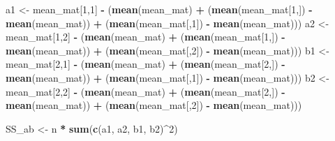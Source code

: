 \documentclass[
]{book}
\newenvironment{Shaded}{\begin{snugshade}}{\end{snugshade}}
\newcommand{\DecValTok}[1]{\textcolor[rgb]{0.00,0.00,0.81}{#1}}
\newcommand{\KeywordTok}[1]{\textcolor[rgb]{0.13,0.29,0.53}{\textbf{#1}}}
\newcommand{\NormalTok}[1]{#1}
\newcommand{\OperatorTok}[1]{\textcolor[rgb]{0.81,0.36,0.00}{\textbf{#1}}}
\newcommand{\StringTok}[1]{\textcolor[rgb]{0.31,0.60,0.02}{#1}}
\begin{document}
\begin{Shaded}
\begin{Highlighting}[]
\NormalTok{a1 <-}\StringTok{ }\NormalTok{mean_mat[}\DecValTok{1}\NormalTok{,}\DecValTok{1}\NormalTok{] }\OperatorTok{-}\StringTok{ }\NormalTok{(}\KeywordTok{mean}\NormalTok{(mean_mat) }\OperatorTok{+}\StringTok{ }
\StringTok{                         }\NormalTok{(}\KeywordTok{mean}\NormalTok{(mean_mat[}\DecValTok{1}\NormalTok{,]) }\OperatorTok{-}\StringTok{ }\KeywordTok{mean}\NormalTok{(mean_mat)) }\OperatorTok{+}\StringTok{ }
\StringTok{                         }\NormalTok{(}\KeywordTok{mean}\NormalTok{(mean_mat[,}\DecValTok{1}\NormalTok{]) }\OperatorTok{-}\StringTok{ }\KeywordTok{mean}\NormalTok{(mean_mat)))}
\NormalTok{a2 <-}\StringTok{ }\NormalTok{mean_mat[}\DecValTok{1}\NormalTok{,}\DecValTok{2}\NormalTok{] }\OperatorTok{-}\StringTok{ }\NormalTok{(}\KeywordTok{mean}\NormalTok{(mean_mat) }\OperatorTok{+}\StringTok{ }
\StringTok{                         }\NormalTok{(}\KeywordTok{mean}\NormalTok{(mean_mat[}\DecValTok{1}\NormalTok{,]) }\OperatorTok{-}\StringTok{ }\KeywordTok{mean}\NormalTok{(mean_mat)) }\OperatorTok{+}\StringTok{ }
\StringTok{                         }\NormalTok{(}\KeywordTok{mean}\NormalTok{(mean_mat[,}\DecValTok{2}\NormalTok{]) }\OperatorTok{-}\StringTok{ }\KeywordTok{mean}\NormalTok{(mean_mat)))}
\NormalTok{b1 <-}\StringTok{ }\NormalTok{mean_mat[}\DecValTok{2}\NormalTok{,}\DecValTok{1}\NormalTok{] }\OperatorTok{-}\StringTok{ }\NormalTok{(}\KeywordTok{mean}\NormalTok{(mean_mat) }\OperatorTok{+}\StringTok{ }
\StringTok{                         }\NormalTok{(}\KeywordTok{mean}\NormalTok{(mean_mat[}\DecValTok{2}\NormalTok{,]) }\OperatorTok{-}\StringTok{ }\KeywordTok{mean}\NormalTok{(mean_mat)) }\OperatorTok{+}\StringTok{ }
\StringTok{                         }\NormalTok{(}\KeywordTok{mean}\NormalTok{(mean_mat[,}\DecValTok{1}\NormalTok{]) }\OperatorTok{-}\StringTok{ }\KeywordTok{mean}\NormalTok{(mean_mat)))}
\NormalTok{b2 <-}\StringTok{ }\NormalTok{mean_mat[}\DecValTok{2}\NormalTok{,}\DecValTok{2}\NormalTok{] }\OperatorTok{-}\StringTok{ }\NormalTok{(}\KeywordTok{mean}\NormalTok{(mean_mat) }\OperatorTok{+}\StringTok{ }
\StringTok{                         }\NormalTok{(}\KeywordTok{mean}\NormalTok{(mean_mat[}\DecValTok{2}\NormalTok{,]) }\OperatorTok{-}\StringTok{ }\KeywordTok{mean}\NormalTok{(mean_mat)) }\OperatorTok{+}\StringTok{ }
\StringTok{                         }\NormalTok{(}\KeywordTok{mean}\NormalTok{(mean_mat[,}\DecValTok{2}\NormalTok{]) }\OperatorTok{-}\StringTok{ }\KeywordTok{mean}\NormalTok{(mean_mat)))}

\NormalTok{SS_ab <-}\StringTok{ }\NormalTok{n }\OperatorTok{*}\StringTok{ }\KeywordTok{sum}\NormalTok{(}\KeywordTok{c}\NormalTok{(a1, a2, b1, b2)}\OperatorTok{^}\DecValTok{2}\NormalTok{)}
\end{Highlighting}
\end{Shaded}
\end{document}
